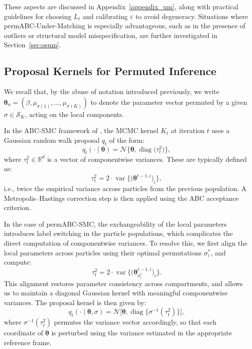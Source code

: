 \documentclass[lineno]{biometrika}
\def\globparam{\beta}
\def\locparam{\mu}
\def\param{\boldsymbol{\theta}}
\begin{document}
These aspects are discussed in Appendix~\ref{appendix_um}, along with practical guidelines for choosing \( L_t \) and calibrating \( \varepsilon \) to avoid degeneracy. Situations where permABC-Under-Matching is especially advantageous, such as in the presence of outliers or structural model misspecification, are further investigated in Section~\ref{sec:osum}.

\subsection{Proposal Kernels for Permuted Inference}
\label{sec:kernels}


We recall that, by the abuse of notation introduced previously, we write \( \param_\sigma = (\globparam, \locparam_{\sigma(1)}, \dots, \locparam_{\sigma(K)}) \) to denote the parameter vector permuted by a given \( \sigma \in \mathcal{S}_K \), acting on the local components.


In the ABC-SMC framework of \citet{delmoralAdaptiveSequentialMonte2012}, the MCMC kernel \( K_t \) at iteration \( t \) uses a Gaussian random walk proposal \( q_t \) of the form:
\[
q_t(\cdot \mid \param) = \mathcal{N}\bigl\{\param, \operatorname{diag}\bigl(\tau_t^2\bigr)\bigr\},
\]
where \( \tau_t^2 \in \mathbb{R}^d \) is a vector of componentwise variances. These are typically defined as:
\[
\tau_t^2 = 2 \cdot \operatorname{var}\bigl\{\bigl(\param^{t-1,i}\bigr)_i\bigr\},
\]
i.e., twice the empirical variance across particles from the previous population. A Metropolis–Hastings correction step is then applied using the ABC acceptance criterion.

In the case of permABC-SMC, the exchangeability of the local parameters introduces label switching in the particle populations, which complicates the direct computation of componentwise variances. To resolve this, we first align the local parameters across particles using their optimal permutations \( \sigma_i^* \), and compute:
\[
\tau_t^2 = 2 \cdot \operatorname{var}\bigl\{\bigl(\param_{\sigma_i^*}^{t-1,i}\bigr)_i\bigr\}.
\]
This alignment restores parameter consistency across compartments, and allows us to maintain a diagonal Gaussian kernel with meaningful componentwise variances. The proposal kernel is then given by:
\[
q_t(\cdot \mid \param, \sigma) = \mathcal{N}\bigl[\param, \operatorname{diag}\bigl\{\sigma^{-1}(\tau_t^2)\bigr\}\bigr],
\]
where \( \sigma^{-1}(\tau_t^2) \) permutes the variance vector accordingly, so that each coordinate of \( \param \) is perturbed using the variance estimated in the appropriate reference frame.
\end{document}
